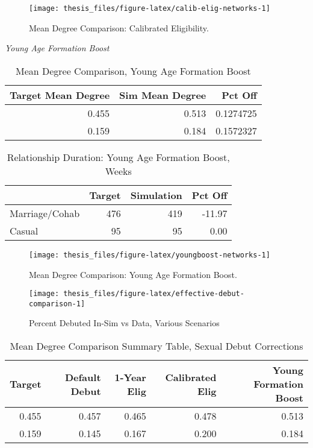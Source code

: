 \documentclass [11pt, proquest] {uwthesis}[2015/03/03]
\begin{document}
\begin{figure}

{\centering \texttt{[image: thesis\_files/figure-latex/calib-elig-networks-1]} 

}

\caption{Mean Degree Comparison: Calibrated Eligibility.}\label{fig:calib-elig-networks}
\end{figure}
\emph{Young Age Formation Boost}
\begin{table}

\caption{\label{tab:youngboost-tab}Mean Degree Comparison, Young Age Formation Boost}
\centering
\begin{tabular}[t]{rrr}
\toprule
Target Mean Degree & Sim Mean Degree & Pct Off\\
\midrule
0.455 & 0.513 & 0.1274725\\
0.159 & 0.184 & 0.1572327\\
\bottomrule
\end{tabular}
\end{table}
\begin{table}

\caption{\label{tab:youngboost-duration}Relationship Duration: Young Age Formation Boost, Weeks}
\centering
\begin{tabular}[t]{lrrr}
\toprule
  & Target & Simulation & Pct Off\\
\midrule
Marriage/Cohab & 476 & 419 & -11.97\\
Casual & 95 & 95 & 0.00\\
\bottomrule
\end{tabular}
\end{table}
\begin{figure}

{\centering \texttt{[image: thesis\_files/figure-latex/youngboost-networks-1]} 

}

\caption{Mean Degree Comparison: Young Age Formation Boost.}\label{fig:youngboost-networks}
\end{figure}
\begin{figure}

{\centering \texttt{[image: thesis\_files/figure-latex/effective-debut-comparison-1]} 

}

\caption{Percent Debuted In-Sim vs Data, Various Scenarios}\label{fig:effective-debut-comparison}
\end{figure}
\begin{table}

\caption{\label{tab:debut-summary-tab}Mean Degree Comparison Summary Table, Sexual Debut Corrections}
\centering
\begin{tabular}[t]{rrrrr}
\toprule
Target & Default Debut & 1-Year Elig & Calibrated Elig & Young Formation Boost\\
\midrule
0.455 & 0.457 & 0.465 & 0.478 & 0.513\\
0.159 & 0.145 & 0.167 & 0.200 & 0.184\\
\bottomrule
\end{tabular}
\end{table}
\end{document}
